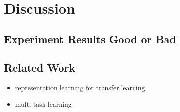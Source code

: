 \section{Discussion}
\label{sec:discussion}

\subsection{Experiment Results Good or Bad}

\subsection{Related Work}

\begin{itemize}
	\item representation learning for transfer learning
	\item multi-task learning
\end{itemize}